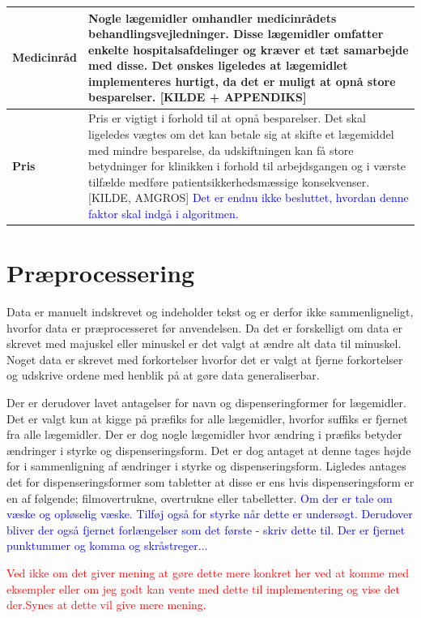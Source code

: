 \begin{longtable}{p{3.5cm}| p{10.5cm}}
\textbf{Medicinråd} & Nogle lægemidler omhandler medicinrådets behandlingsvejledninger. Disse lægemidler omfatter enkelte hospitalsafdelinger og kræver et tæt samarbejde med disse. Det ønskes ligeledes at lægemidlet implementeres hurtigt, da det er muligt at opnå store besparelser. [KILDE + APPENDIKS]\\ \hline 
\textbf{Pris} &  Pris er vigtigt i forhold til at opnå besparelser. Det skal ligeledes vægtes om det kan betale sig at skifte et lægemiddel med mindre besparelse, da udskiftningen kan få store betydninger for klinikken i forhold til arbejdsgangen og i værste tilfælde medføre patientsikkerhedsmæssige konsekvenser. [KILDE, AMGROS] \textcolor{blue}{Det er endnu ikke besluttet, hvordan denne faktor skal indgå i algoritmen.} \\ \hline
    \end{longtable}

\section{Præprocessering}
Data er manuelt indskrevet og indeholder tekst og er derfor ikke sammenligneligt, hvorfor data er præprocesseret før anvendelsen. Da det er forskelligt om data er skrevet med majuskel eller minuskel er det valgt at ændre alt data til minuskel. Noget data er skrevet med forkortelser hvorfor det er valgt at fjerne forkortelser og udskrive ordene med henblik på at gøre data generaliserbar. 

Der er derudover lavet antagelser for navn og dispenseringformer for lægemidler. Det er valgt kun at kigge på præfiks for alle lægemidler, hvorfor suffiks er fjernet fra alle lægemidler. Der er dog nogle lægemidler  hvor ændring i præfiks betyder ændringer i styrke og dispenseringsform. Det er dog antaget at denne tages højde for i sammenligning af ændringer i styrke og dispenseringsform. Ligledes antages det for dispenseringsformer som tabletter at disse er ens hvis dispenseringsform er en af følgende; filmovertrukne, overtrukne eller  tabelletter. \textcolor{blue}{Om der er tale om væske og opløselig væske. Tilføj også for styrke når dette er undersøgt. Derudover bliver der også fjernet forlængelser som det første - skriv dette til. Der er fjernet punktummer og komma og skråstreger...}

\textcolor{red}{Ved ikke om det giver mening at gøre dette mere konkret her ved at komme med eksempler eller om jeg godt kan vente med dette til implementering og vise det der.Synes at dette vil give mere mening.}

